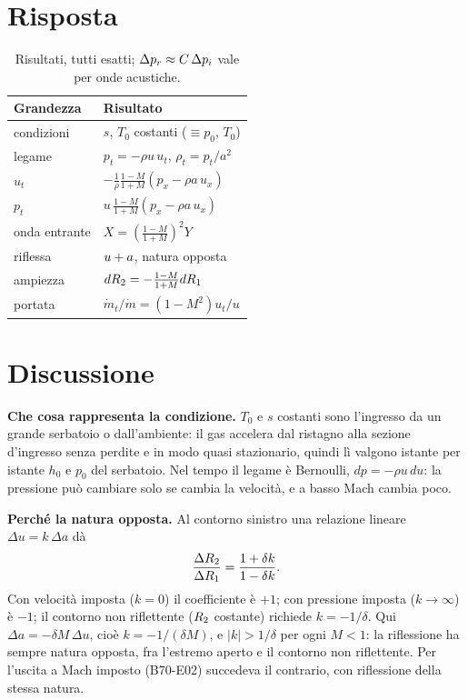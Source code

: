 \section*{Risposta}
\begin{table}[H]
  \centering
  \small
  \begin{tabular}{ll}
    \toprule
    Grandezza & Risultato \\
    \midrule
    condizioni & $s$, $T_0$ costanti ($\equiv p_0$, $T_0$) \\
    legame & $p_t=-\rho u\,u_t$, $\rho_t=p_t/a^2$ \\
    $u_t$ & $-\frac{1}{\rho}\frac{1-M}{1+M}(p_x-\rho a\,u_x)$ \\
    $p_t$ & $u\,\frac{1-M}{1+M}(p_x-\rho a\,u_x)$ \\
    onda entrante & $X=\left(\frac{1-M}{1+M}\right)^2Y$ \\
    riflessa & $u+a$, natura opposta \\
    ampiezza & $dR_2=-\frac{1-M}{1+M}dR_1$ \\
    portata & $\dot m_t/\dot m=(1-M^2)u_t/u$ \\
    \bottomrule
  \end{tabular}
  \caption{Risultati, tutti esatti; $\Delta p_r\approx C\,\Delta p_i$ vale per onde acustiche.}
\end{table}

\section*{Discussione}
\textbf{Che cosa rappresenta la condizione.} $T_0$ e $s$ costanti sono l'ingresso da un grande serbatoio o
dall'ambiente: il gas accelera dal ristagno alla sezione d'ingresso senza perdite e in modo quasi stazionario,
quindi lì valgono istante per istante $h_0$ e $p_0$ del serbatoio. Nel tempo il legame è Bernoulli,
$dp=-\rho u\,du$: la pressione può cambiare solo se cambia la velocità, e a basso Mach cambia poco.

\textbf{Perché la natura opposta.} Al contorno sinistro una relazione lineare $\Delta u=k\,\Delta a$ dà
\[
  \frac{\Delta R_2}{\Delta R_1}=\frac{1+\delta k}{1-\delta k}.
\]
Con velocità imposta ($k=0$) il coefficiente è $+1$; con pressione imposta ($k\to\infty$) è $-1$; il contorno non
riflettente ($R_2$ costante) richiede $k=-1/\delta$. Qui $\Delta a=-\delta M\,\Delta u$, cioè $k=-1/(\delta M)$, e
$|k|>1/\delta$ per ogni $M<1$: la riflessione ha sempre natura opposta, fra l'estremo aperto e il contorno non
riflettente. Per l'uscita a Mach imposto (B70-E02) succedeva il contrario, con riflessione della stessa natura.

